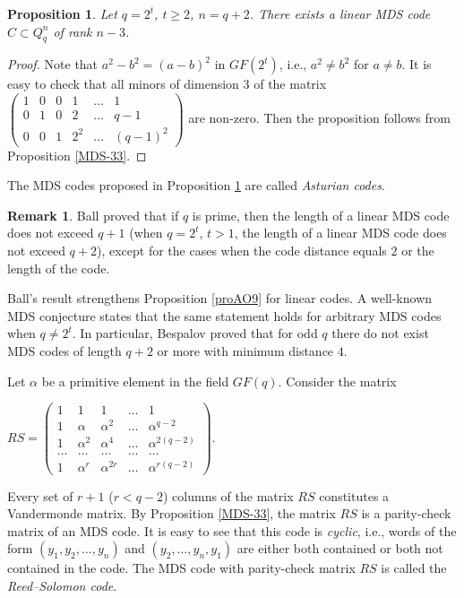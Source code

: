 \documentclass[11pt]{article}
\newtheorem{claim}{Proposition}[section]
\theoremstyle{definition}
\newtheorem{remark}{Remark}[section]
\begin{document}
{{{\begin{claim} \label{MDS-333} Let $q=2^t$, $t\geq 2$, $n=q+2$. There exists a
 linear {\rm MDS} code $C\subset Q_q^n$ of rank $n-3$.
\end{claim}
\begin{proof} Note that $a^2-b^2=(a-b)^2$ in $GF(2^t)$, i.e., $a^2\neq b^2$ for $a\neq b$. It is easy to check that
all minors of dimension $3$ of the matrix $\left(\begin{array}{ccccccc}
1&0&0& 1&\dots&1  \\
0&1&0& 2&\dots& q-1 \\
0&0&1& 2^2 &\dots & (q-1)^2
\end{array} \right)$
are non-zero. Then the proposition follows from Proposition \ref{MDS-33}.
\end{proof}

The {\rm MDS} codes proposed in Proposition \ref{MDS-333} are called {\sl
    Asturian codes}.

\begin{remark}
Ball \cite{Ball} proved that if $q$ is prime, then the length of a
linear MDS code does not exceed $q+1$ (when $q=2^t$, $t>1$, the length of a
linear MDS code does not exceed $q+2$), except for the cases
when the code distance equals $2$ or the length of the code. \label{MDSprob}
\end{remark}

Ball's result strengthens Proposition \ref{proAO9} for linear
codes. A well-known MDS conjecture states that the same statement holds
for arbitrary MDS codes when $q\neq 2^t$. In particular, Bespalov
\cite{Bespalov} proved that for odd $q$ there do not exist
MDS codes of length $q+2$ or more with minimum distance $4$.

Let $\alpha$ be a primitive element in the field $GF(q)$. Consider the
matrix

$RS= \left(\begin{array}{ccccc}
1& 1&     1&       \dots&1  \\
1& \alpha &\alpha^2&\dots& \alpha^{q-2} \\
1& \alpha^2 &\alpha^4&\dots& \alpha^{2(q-2)} \\
\dots& \dots& \dots& \dots & \dots\\
1& \alpha^r &\alpha^{2r}& \dots & \alpha^{r(q-2)}
\end{array} \right).$

Every set of $r+1$ ($r<q-2$) columns of the matrix $RS$ constitutes
a Vandermonde matrix. By Proposition \ref{MDS-33}, the matrix $RS$
is a parity-check matrix of an {\rm MDS} code. It is easy to see that
this code is {\sl cyclic}, i.e., words of the form
$(y_1,y_2,\dots,y_n)$ and $(y_2,\dots,y_n,y_1)$ are either both contained or
both not contained in the code. The {\rm MDS} code with parity-check
matrix $RS$ is called the {\sl  Reed--Solomon code}. 

}}}
\end{document}
